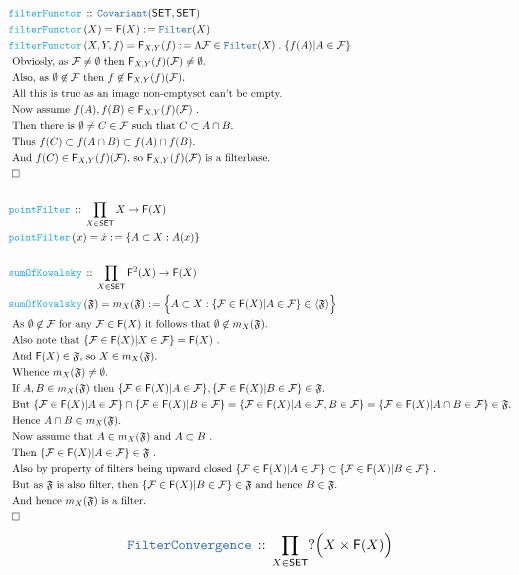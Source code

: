 \documentclass[12pt]{scrartcl}
\newcommand{\TYPE}[1]{\textcolor{NavyBlue}{\mathtt{#1}}}
\newcommand{\FUNC}[1]{\textcolor{Cerulean}{\mathtt{#1}}}
\renewcommand{\.}{\; . \;}
\newcommand{\de}{: \kern 0.1pc =}
\newcommand{\Act}[1]{\left( #1 \right)}
\newcommand{\DeclareType}[2]{& \TYPE{#1} \, :: \, #2 \\}
\newcommand{\DeclareFunc}[2]{& \FUNC{#1} \, :: \, #2 \\}
\newcommand{\DefineNamedFunc}[4]{&  \FUNC{#1}\Act{#2} = #3 \de #4 \\}
\newcommand{\Page}[1]{ \begin{align*} #1 \end{align*}   }
\newcommand{\Explain}[1]{& \text{#1.} \\}
\newcommand{\QED}{\; \square}
\newcommand{\EndProof}{& \QED \\}
\newcommand{\Cov}{\TYPE{Covariant}}
\newcommand{\SET}{\mathsf{SET}}
\newcommand{\Filter}{\TYPE{Filter}}
\newcommand{\FILT}{\mathsf{F}}
\newcommand{\F}{\mathcal{F}}
\begin{document}
\Page{
	\DeclareFunc{filterFunctor}{\Cov(\SET,\SET)}
	\DefineNamedFunc{filterFunctor}{X}{\FILT(X)}{\TYPE{Filter}(X)}
	\DefineNamedFunc{filterFunctor}{X,Y,f}{\FILT_{X,Y}(f)}{
		\Lambda \F \in \Filter(X) \. \{  f(A) | A \in \F    \}	
	}
	\Explain{
		Obviosly, as $\F \neq \emptyset$ then $\FILT_{X,Y}(f)(\F) \neq \emptyset$}
	\Explain{
		Also, as $\emptyset \not \in \F$ then $f \not \in \FILT_{X,Y}(f)(\F)$}
	\Explain{
		All this is true as an image non-emptyset can't be empty}
	\Explain{
		Now assume $f(A),f(B) \in \FILT_{X,Y}(f)(\F)$
	}
	\Explain{
		Then there is $\emptyset \neq C \in \F$
		such that   $C \subset A \cap B$}
	\Explain{
		Thus  $f(C) \subset f(A \cap B) \subset f(A) \cap f(B)$}
	\Explain{ 
		And $f(C) \in \FILT_{X,Y}(f)(\F)$, so
		$\FILT_{X,Y}(f)(\F)$ is a filterbase}
	\EndProof
	\\
	\DeclareFunc{pointFilter}{\prod_{X \in \SET} X \to \FILT(X)}
	\DefineNamedFunc{pointFilter}{x}{\dot x}{\{ A \subset X : A(x) \}}
	\\
	\DeclareFunc{sumOfKowalsky}{\prod_{X \in \SET} \FILT^2(X) \to \FILT(X)}
	\DefineNamedFunc{sumOfKovalsky}{\mathfrak{F}}{m_X(\mathfrak{F})}
	{
		\Big\{ A \subset X :  \{ \F \in \FILT(X) | A \in \F  \} \in \langle\mathfrak{F}\rangle  \Big\}
	}
	\Explain{
		As $\emptyset \not \in \F$ for any 
		$\F \in \FILT(X)$ it follows that
		$\emptyset \not \in m_X(\mathfrak{F})$}
	\Explain{
		Also note that 
		$\{ \F \in \FILT(X) | X \in \F  \} = \FILT(X)$
	}
	\Explain{
		And $\FILT(X) \in \mathfrak{F}$,
		so $X \in m_X(\mathfrak{F})$}
	\Explain{
		Whence $m_X(\mathfrak{F})\neq \emptyset$}
	\Explain{
		If $A,B \in m_X(\mathfrak{F})$ 
		then
		$\{ \F \in \FILT(X) | A \in \F  \},\{ \F \in \FILT(X) | B \in \F  \} \in \mathfrak{F}$}
	\Explain{
		But
		$
			\{ \F \in \FILT(X) | A \in \F  \} \cap \{ \F \in \FILT(X) | B \in \F  \}
			=
			\{   \F \in \FILT(X) | A \in \F, B \in \F \} 
			=
			\{ \F \in \FILT(X) |  A \cap B \in \F  \} \in \mathfrak{F}
		$}
	\Explain{
		Hence $A \cap B \in m_X(\mathfrak{F})$}
	\Explain{
		Now assume that $A \in m_X(\mathfrak{F})$
		and $A \subset B$
	}
	\Explain{
		Then $\{ \F \in \FILT(X) | A \in \F  \}\in \mathfrak{F}$
	}
	\Explain{
		Also by property of filters being upward closed
		$
			\{ \F \in \FILT(X) | A \in \F  \} \subset
			\{ \F \in \FILT(X) | B \in \F  \}
		$
	}
	\Explain{
		But as $\mathfrak{F}$ is also filter,
		then $\{ \F \in \FILT(X) | B \in \F  \} \in \mathfrak{F}$
		and hence $B \in \mathfrak{F}$}
	\Explain{
		And hence $m_X(\mathfrak{F})$ is a filter}
	\EndProof
}\Page{
	\DeclareType{FilterConvergence}
	{
		\prod_{X \in \SET} ?\Big(X \times \FILT(X)\Big)
}}
\end{document}
